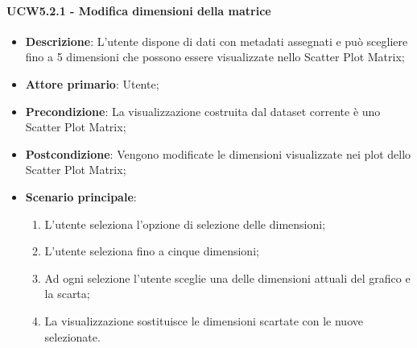 \paragraph{UCW5.2.1 - Modifica dimensioni della matrice}
\label{par:ucw5.2.1}
\begin{itemize}
    \item \textbf{Descrizione}:     L’utente dispone di dati con metadati assegnati e può
                                    scegliere fino a 5 dimensioni che possono essere visualizzate nello Scatter Plot
                                    Matrix;

    \item \textbf{Attore primario}: Utente;

    \item \textbf{Precondizione}:   La visualizzazione costruita dal dataset corrente è uno Scatter Plot Matrix;
    \item \textbf{Postcondizione}:  Vengono modificate le dimensioni visualizzate nei plot dello Scatter Plot Matrix;

	\item \textbf{Scenario principale}:
        \begin{enumerate}
            \item   L'utente seleziona l'opzione di selezione delle dimensioni;
            \item   L'utente seleziona fino a cinque dimensioni;

            \item   Ad ogni selezione l'utente
                    sceglie una delle dimensioni attuali del grafico e la scarta;

            \item   La visualizzazione sostituisce le dimensioni scartate con le nuove selezionate.
        \end{enumerate}
\end{itemize}

